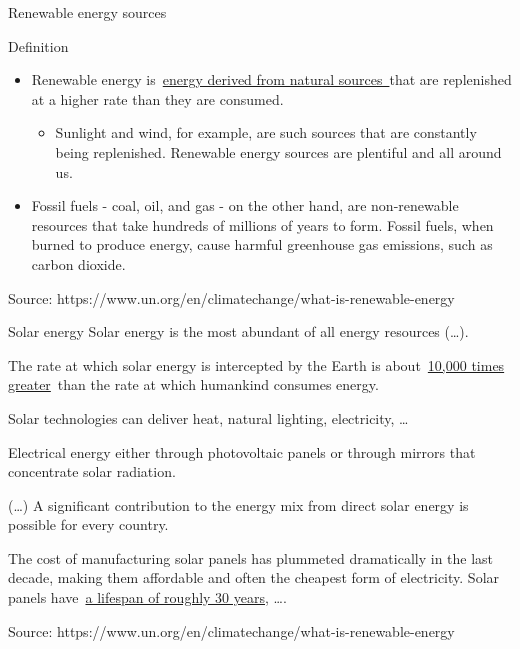 \begin{frame}{Renewable energy sources}
\label{renewable-energy-sources}
\end{frame}

\begin{frame}{Definition}
\label{definition}
\begin{itemize}
\tightlist
\item
  Renewable energy
  is~\href{https://unece.org/DAM/energy/se/pdfs/comm25/ECE_ENERGY_2016_4.pdf}{energy
  derived from natural sources~}that are replenished at a higher rate
  than they are consumed.

  \begin{itemize}
  \tightlist
  \item
    Sunlight and wind, for example, are such sources that are constantly
    being replenished. Renewable energy sources are plentiful and all
    around us.
  \end{itemize}
\item
  Fossil fuels - coal, oil, and gas - on the other hand, are
  non-renewable resources that take hundreds of millions of years to
  form. Fossil fuels, when burned to produce energy, cause harmful
  greenhouse gas emissions, such as carbon dioxide.
\end{itemize}

Source: https://www.un.org/en/climatechange/what-is-renewable-energy
\end{frame}

\begin{frame}{Solar energy}
\label{solar-energy}
Solar energy is the most abundant of all energy resources (\ldots).

The rate at which solar energy is intercepted by the Earth is
about~\href{https://www.ipcc.ch/site/assets/uploads/2018/03/Chapter-3-Direct-Solar-Energy-1.pdf}{10,000
times greater}~than the rate at which humankind consumes energy.

Solar technologies can deliver heat, natural lighting, electricity,
\ldots{}

Electrical energy either through photovoltaic panels or through mirrors
that concentrate solar radiation.

(\ldots) A significant contribution to the energy mix from direct solar
energy is possible for every country.

The cost of manufacturing solar panels has plummeted dramatically in the
last decade, making them affordable and often the cheapest form of
electricity. Solar panels have~\href{https://www.irena.org/solar}{a
lifespan of roughly 30 years}, \ldots.

Source: https://www.un.org/en/climatechange/what-is-renewable-energy
\end{frame}

